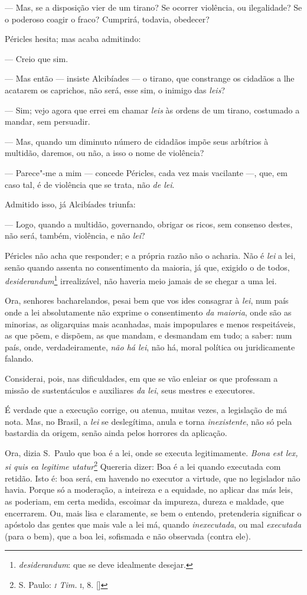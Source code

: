 --- Mas, se a disposição vier de um tirano? Se ocorrer
violência, ou ilegalidade? Se o poderoso coagir o fraco? Cumprirá,
todavia, obedecer? 

Péricles hesita; mas acaba admitindo:

--- Creio que sim.

--- Mas então --- insiste Alcibíades --- o tirano, que constrange 
os cidadãos a lhe acatarem os caprichos, não será, esse sim, 
o inimigo das \textit{leis}?

--- Sim; vejo agora que errei em chamar \textit{leis} às
ordens de um tirano, costumado a mandar, sem persuadir.

--- Mas, quando um diminuto número de cidadãos impõe seus
arbítrios à multidão, daremos, ou não, a isso o nome de violência?

--- Parece"-me a mim --- concede Péricles, cada vez mais
vacilante ---, que, em caso tal, é de violência que se
trata, não \textit{de lei}.

Admitido isso, já Alcibíades triunfa:

--- Logo, quando a multidão, governando, obrigar os ricos,
sem consenso destes, não será, também, violência, e não
\textit{lei}?

Péricles não acha que responder; e a própria
razão não o acharia. Não é \textit{lei} a lei, senão quando assenta no
consentimento da maioria, já que, exigido o de todos,
\textit{desiderandum}\footnote{ \textit{desiderandum}: que se deve idealmente
desejar.} irrealizável, não haveria meio jamais de se chegar a uma lei.

Ora, senhores bacharelandos, pesai bem que vos ides consagrar à
\textit{lei}, num país onde a lei absolutamente não exprime o
consentimento \textit{da maioria}, onde são as minorias, as oligarquias
mais acanhadas, mais impopulares e menos respeitáveis, as que põem, e
dispõem, as que mandam, e desmandam em tudo; a saber: num país, onde,
verdadeiramente, \textit{não há lei}, não há, moral política ou
juridicamente falando.

Considerai, pois, nas dificuldades, em que se vão enleiar os que
professam a missão de sustentáculos e auxiliares \textit{da lei}, seus
mestres e executores.

É verdade que a execução corrige, ou atenua, muitas vezes, a
legislação de má nota. Mas, no Brasil, a \textit{lei} se deslegítima,
anula e torna \textit{inexistente}, não só pela bastardia da origem,
senão ainda pelos horrores da aplicação.

Ora, dizia S.~Paulo que boa é a lei, onde se executa legitimamente. \textit{Bona est lex,
si quis ea legitime utatur}\footnote{ S. Paulo: \textit{\textsc{i} Tim. }\textsc{i},
8. []} Quereria dizer: Boa é a lei quando executada com retidão.
Isto é: boa será, em havendo no executor a virtude, que no legislador
não havia. Porque só a moderação, a inteireza e a equidade, no aplicar
das más leis, as poderiam, em certa medida, escoimar da impureza,
dureza e maldade, que encerrarem. Ou, mais lisa e claramente, se bem o
entendo, pretenderia significar o apóstolo das gentes que mais vale a
lei má, quando \textit{inexecutada}, ou mal \textit{executada} (para o
bem), que a boa lei, sofismada e não observada (contra ele).

